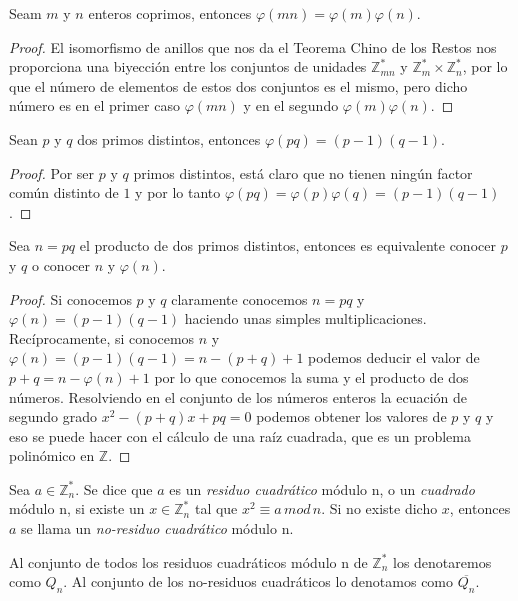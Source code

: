 \begin{corollary}
Seam $m$ y $n$ enteros coprimos, entonces $\varphi(mn)=\varphi(m)\varphi(n)$.
\end{corollary}
\begin{proof}
El isomorfismo de anillos que nos da el Teorema Chino de los Restos nos proporciona una
biyecci\'on entre los conjuntos de unidades ${\mathbb Z}_{mn}^*$ y ${\mathbb Z}_m^* \times
{\mathbb Z}_n^*$, por lo que el n\'umero de elementos de estos dos conjuntos es
el mismo, pero dicho n\'umero es en el primer caso $\varphi(mn)$ y en el segundo $\varphi(m)\varphi(n)$.
\end{proof}

\begin{corollary}
Sean $p$ y $q$ dos primos distintos, entonces $\varphi(pq) = (p-1)(q-1)$.
\end{corollary}
\begin{proof}
Por ser $p$ y $q$ primos distintos, est\'a claro que no tienen ning\'un factor
com\'un distinto de $1$ y por lo tanto $\varphi(pq) = \varphi(p)\varphi(q) =
(p-1)(q-1)$.
\end{proof}

\begin{remark}
Sea $n = pq$ el producto de dos primos distintos, entonces es
equivalente conocer $p$ y $q$ o conocer $n$ y $\varphi(n)$.
\end{remark}
\begin{proof}
Si conocemos $p$ y $q$ claramente conocemos $n = pq$ y $\varphi(n) = (p-1)(q-1)$
haciendo unas simples multiplicaciones.
Rec\'iprocamente, si conocemos $n$ y $\varphi(n) = (p-1)(q-1) = n - (p+q) + 1$
podemos deducir el valor de $p+q = n -\varphi(n) + 1$ por lo que conocemos la suma y el
producto de dos n\'umeros. Resolviendo en el conjunto de los n\'umeros enteros
la ecuaci\'on de segundo grado $x^2 -(p+q)x + pq = 0$ podemos obtener los valores
de $p$ y $q$ y eso se puede hacer con el c\'alculo de una ra\'iz cuadrada, que
es un problema polin\'omico en ${\mathbb Z}$.
\end{proof}

\begin{definition}
	Sea $a\in \mathbb{Z}^*_n$. Se dice que $a$ es un \textit{residuo cuadrático}
	módulo n, o un \textit{cuadrado} módulo n, si existe un $x \in \mathbb{Z}^*_n$
	tal que $x^2 \equiv a \, mod \, n$.
	Si no existe dicho $x$, entonces $a$ se llama un \textit{no-residuo cuadrático} módulo n.

	Al conjunto de todos los residuos cuadráticos módulo n de $\mathbb{Z}^*_n$ los
	denotaremos como $Q_n$.
	Al conjunto de los no-residuos cuadráticos lo denotamos como $\overline{Q_n}$.
\end{definition}

